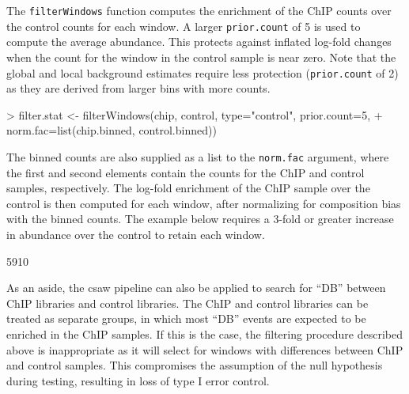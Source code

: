\documentclass[12pt]{report}
\renewenvironment{Schunk}{\vspace{0pt}}{\vspace{0pt}}
\newcommand{\pkgname}{csaw}
\newcommand{\code}[1]{{\small\texttt{#1}}}
\begin{document}
The \code{filterWindows} function computes the enrichment of the ChIP counts over the control counts for each window.
A larger \code{prior.count} of 5 is used to compute the average abundance.
This protects against inflated log-fold changes when the count for the window in the control sample is near zero.
Note that the global and local background estimates require less protection (\code{prior.count} of 2) as they are derived from larger bins with more counts.

\begin{Schunk}
\begin{Sinput}
> filter.stat <- filterWindows(chip, control, type="control", prior.count=5,
+     norm.fac=list(chip.binned, control.binned))
\end{Sinput}
\end{Schunk}

The binned counts are also supplied as a list to the \code{norm.fac} argument, where the first and second elements contain the counts for the ChIP and control samples, respectively.
The log-fold enrichment of the ChIP sample over the control is then computed for each window, after normalizing for composition bias with the binned counts.
The example below requires a 3-fold or greater increase in abundance over the control to retain each window.

\begin{Schunk}
\begin{Soutput}
[1] 5910
\end{Soutput}
\end{Schunk}

As an aside, the \pkgname{} pipeline can also be applied to search for ``DB'' between ChIP libraries and control libraries. 
The ChIP and control libraries can be treated as separate groups, in which most ``DB'' events are expected to be enriched in the ChIP samples. 
If this is the case, the filtering procedure described above is inappropriate as it will select for windows with differences between ChIP and control samples. 
This compromises the assumption of the null hypothesis during testing, resulting in loss of type I error control.

\end{document}
